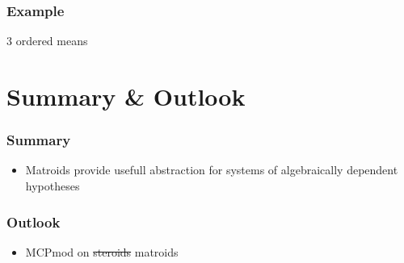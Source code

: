\documentclass[bigger]{beamer}
\newcommand{\parentd}{../}
\begin{document}
\begin{frame}
  \frametitle{Example}
  3 ordered means 
\end{frame}

\section{Summary \& Outlook}



\begin{frame}
\frametitle{Summary}
\begin{itemize}
\item Matroids provide usefull abstraction for systems of algebraically dependent hypotheses
\end{itemize}
\end{frame}



\begin{frame}
\frametitle{Outlook}
\begin{itemize}
\item MCPmod on \sout{steroids} matroids
\end{itemize}
\end{frame}



\end{document}
